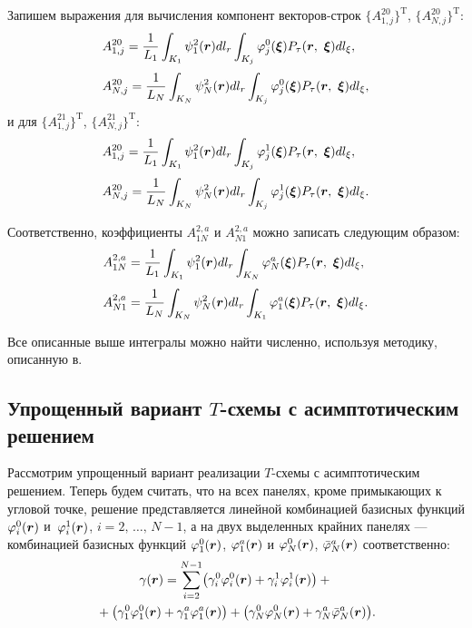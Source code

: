 \documentclass[12pt, a4paper]{article}
\renewcommand{\vec}[1]{\text{\mathversion{bold}${#1}$}}%
\begin{document}
Запишем выражения для вычисления компонент векторов-строк $\{ A^{20}_{1,j}\}^\mathrm{T}$, $\{ A^{20}_{N,j}\}^\mathrm{T}$: 
\[
\begin{array}{@{}l@{}}
\displaystyle A^{20}_{1,j} = \frac{1}{L_1} \int_{K_1} \psi_1^2(\vec r) dl_r\int_{K_j}\varphi_j^0(\vec \xi)P_\tau(\vec{r},\, \, \vec{\xi }) dl_{\xi },\\[5mm]
\displaystyle A^{20}_{N,j} = \frac{1}{L_N} \int_{K_N} \psi_N^2(\vec r) dl_r\int_{K_j}\varphi_j^0(\vec \xi)P_\tau(\vec{r},\, \, \vec{\xi }) dl_{\xi },
\end{array}
\]
и  для $\{ A^{21}_{1,j}\}^\mathrm{T}$, $\{ A^{21}_{N,j}\}^\mathrm{T}$:
\[
\begin{array}{@{}l@{}}
\displaystyle A^{20}_{1,j} = \frac{1}{L_1} \int_{K_1} \psi_1^2(\vec r) dl_r\int_{K_j}\varphi_j^1(\vec \xi)P_\tau(\vec{r},\, \, \vec{\xi }) dl_{\xi },\\[5mm]
\displaystyle A^{20}_{N,j} = \frac{1}{L_N} \int_{K_N} \psi_N^2(\vec r) dl_r\int_{K_j}\varphi_j^1(\vec \xi)P_\tau(\vec{r},\, \, \vec{\xi }) dl_{\xi }.
\end{array}
\]

Соответственно, коэффициенты $A^{2,a}_{1N}$ и $A^{2,a}_{N1}$ можно записать следующим образом:
\[
\begin{array}{@{}l@{}}
\displaystyle A^{2,a}_{1N} = \frac{1}{L_1} \int_{K_1} \psi_1^2(\vec r) dl_r\int_{K_N}\varphi_N^a(\vec \xi)P_\tau(\vec{r},\, \, \vec{\xi }) dl_{\xi },\\[5mm]
\displaystyle A^{2,a}_{N1} = \frac{1}{L_N} \int_{K_N} \psi_N^2(\vec r) dl_r\int_{K_1}\varphi_1^a(\vec \xi)P_\tau(\vec{r},\, \, \vec{\xi }) dl_{\xi }.
\end{array}
\]

Все описанные выше интегралы можно найти численно, используя методику, описанную в\cite{Marchevskii}. 
\subsection{Упрощенный вариант $T$-схемы с асимптотическим решением}

Рассмотрим упрощенный вариант реализации $T$-схемы с асимптотическим решением. Теперь будем считать, что на всех панелях, кроме примыкающих к угловой точке, решение представляется линейной комбинацией базисных функций $\varphi^0_i(\vec r)$ и~$\varphi^1_i(\vec r)$, $i=2,\,\ldots,\,N-1$, а на двух выделенных крайних панелях --- комбинацией базисных функций $\varphi^0_1(\vec r)$, $\varphi^a_1(\vec r)$ и $\varphi^0_N(\vec r)$, $\bar\varphi^a_N(\vec r)$ соответственно:
\begin{multline}
\label{asympsollight}
\gamma(\vec r) = \sum\limits_{i=2}^{N-1} \bigl( \gamma_i^0 \varphi_i^0(\vec r) + \gamma_i^1 \varphi_i^1(\vec r) \bigr) + {}\\
{} + \bigl( \gamma_1^0 \varphi_1^0(\vec r) + \gamma_1^a \varphi_1^a(\vec r) \bigr) +
\bigl( \gamma_N^0 \varphi_N^0(\vec r) + \gamma_N^a \bar\varphi_N^a(\vec r) \bigr).
\end{multline}
\end{document}
